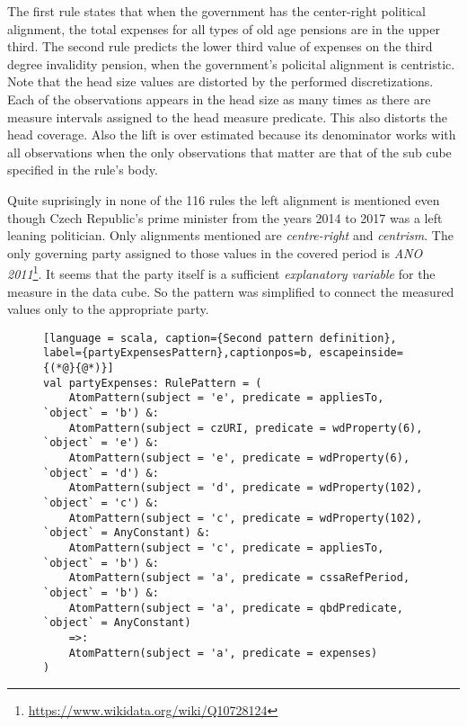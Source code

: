The first rule states that when the government has the center-right political alignment, the total expenses for all types of old age pensions are in the upper third. The second rule predicts the lower third value of expenses on the third degree invalidity pension, when the government's policital alignment is centristic. Note that the head size values are distorted by the performed discretizations. Each of the  observations appears in the head size as many times as there are measure intervals assigned to the head measure predicate. This also distorts the head coverage. Also the lift is over estimated because its denominator works with all  observations when the only observations that matter are that of the sub cube specified in the rule's body.

Quite suprisingly in none of the 116 rules the left alignment is mentioned even though Czech Republic's prime minister from the years 2014 to 2017 was a left leaning politician. Only alignments mentioned are \textit{centre-right} and \textit{centrism}. The only governing party assigned to those values in the covered period is \textit{ANO 2011}\footnote{\href{https://www.wikidata.org/wiki/Q10728124}{https://www.wikidata.org/wiki/Q10728124}}. It seems that the party itself is a sufficient \textit{explanatory variable} for the measure in the data cube. So the pattern was simplified to connect the measured values only to the appropriate party.

\begin{figure}[h]
\begin{lstlisting}[language = scala, caption={Second pattern definition}, label={partyExpensesPattern},captionpos=b, escapeinside={(*@}{@*)}]
val partyExpenses: RulePattern = (
    AtomPattern(subject = 'e', predicate = appliesTo, `object` = 'b') &:
    AtomPattern(subject = czURI, predicate = wdProperty(6), `object` = 'e') &:
    AtomPattern(subject = 'e', predicate = wdProperty(6), `object` = 'd') &:
    AtomPattern(subject = 'd', predicate = wdProperty(102), `object` = 'c') &:  
    AtomPattern(subject = 'c', predicate = wdProperty(102), `object` = AnyConstant) &:
    AtomPattern(subject = 'c', predicate = appliesTo, `object` = 'b') &:
    AtomPattern(subject = 'a', predicate = cssaRefPeriod, `object` = 'b') &:
    AtomPattern(subject = 'a', predicate = qbdPredicate, `object` = AnyConstant)
    =>:
    AtomPattern(subject = 'a', predicate = expenses)
)
\end{lstlisting}
\end{figure}

